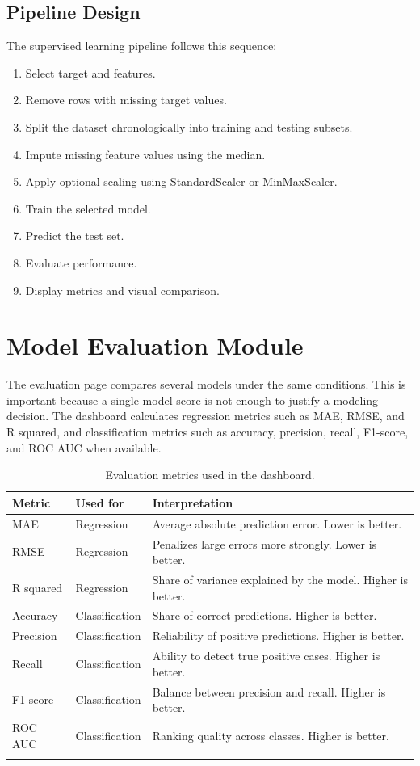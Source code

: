 \subsection{Pipeline Design}

The supervised learning pipeline follows this sequence:
\begin{enumerate}
\item Select target and features.
\item Remove rows with missing target values.
\item Split the dataset chronologically into training and testing subsets.
\item Impute missing feature values using the median.
\item Apply optional scaling using StandardScaler or MinMaxScaler.
\item Train the selected model.
\item Predict the test set.
\item Evaluate performance.
\item Display metrics and visual comparison.
\end{enumerate}

\section{Model Evaluation Module}

The evaluation page compares several models under the same conditions. This is important because a single model score is not enough to justify a modeling decision. The dashboard calculates regression metrics such as MAE, RMSE, and R squared, and classification metrics such as accuracy, precision, recall, F1-score, and ROC AUC when available.

\begin{longtable}{p{3cm}p{5cm}p{6cm}}
\toprule
\textbf{Metric} & \textbf{Used for} & \textbf{Interpretation} \\
\midrule
MAE & Regression & Average absolute prediction error. Lower is better. \\
RMSE & Regression & Penalizes large errors more strongly. Lower is better. \\
R squared & Regression & Share of variance explained by the model. Higher is better. \\
Accuracy & Classification & Share of correct predictions. Higher is better. \\
Precision & Classification & Reliability of positive predictions. Higher is better. \\
Recall & Classification & Ability to detect true positive cases. Higher is better. \\
F1-score & Classification & Balance between precision and recall. Higher is better. \\
ROC AUC & Classification & Ranking quality across classes. Higher is better. \\
\bottomrule
\caption{Evaluation metrics used in the dashboard.}
\end{longtable}


